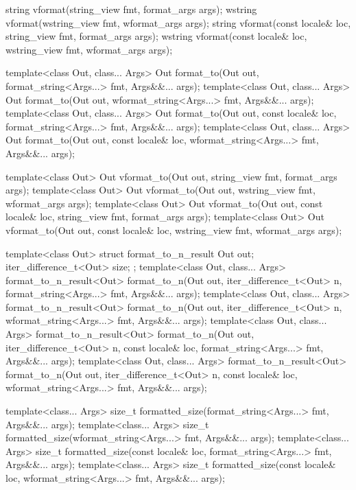 \begin{codeblock}
{  string vformat(string_view fmt, format_args args);
  wstring vformat(wstring_view fmt, wformat_args args);
  string vformat(const locale& loc, string_view fmt, format_args args);
  wstring vformat(const locale& loc, wstring_view fmt, wformat_args args);

  template<class Out, class... Args>
    Out format_to(Out out, format_string<Args...> fmt, Args&&... args);
  template<class Out, class... Args>
    Out format_to(Out out, wformat_string<Args...> fmt, Args&&... args);
  template<class Out, class... Args>
    Out format_to(Out out, const locale& loc, format_string<Args...> fmt, Args&&... args);
  template<class Out, class... Args>
    Out format_to(Out out, const locale& loc, wformat_string<Args...> fmt, Args&&... args);

  template<class Out>
    Out vformat_to(Out out, string_view fmt, format_args args);
  template<class Out>
    Out vformat_to(Out out, wstring_view fmt, wformat_args args);
  template<class Out>
    Out vformat_to(Out out, const locale& loc, string_view fmt, format_args args);
  template<class Out>
    Out vformat_to(Out out, const locale& loc, wstring_view fmt, wformat_args args);

  template<class Out> struct format_to_n_result {
    Out out;
    iter_difference_t<Out> size;
  };
  template<class Out, class... Args>
    format_to_n_result<Out> format_to_n(Out out, iter_difference_t<Out> n,
                                        format_string<Args...> fmt, Args&&... args);
  template<class Out, class... Args>
    format_to_n_result<Out> format_to_n(Out out, iter_difference_t<Out> n,
                                        wformat_string<Args...> fmt, Args&&... args);
  template<class Out, class... Args>
    format_to_n_result<Out> format_to_n(Out out, iter_difference_t<Out> n,
                                        const locale& loc, format_string<Args...> fmt,
                                        Args&&... args);
  template<class Out, class... Args>
    format_to_n_result<Out> format_to_n(Out out, iter_difference_t<Out> n,
                                        const locale& loc, wformat_string<Args...> fmt,
                                        Args&&... args);

  template<class... Args>
    size_t formatted_size(format_string<Args...> fmt, Args&&... args);
  template<class... Args>
    size_t formatted_size(wformat_string<Args...> fmt, Args&&... args);
  template<class... Args>
    size_t formatted_size(const locale& loc, format_string<Args...> fmt, Args&&... args);
  template<class... Args>
    size_t formatted_size(const locale& loc, wformat_string<Args...> fmt, Args&&... args);

}
\end{codeblock}
